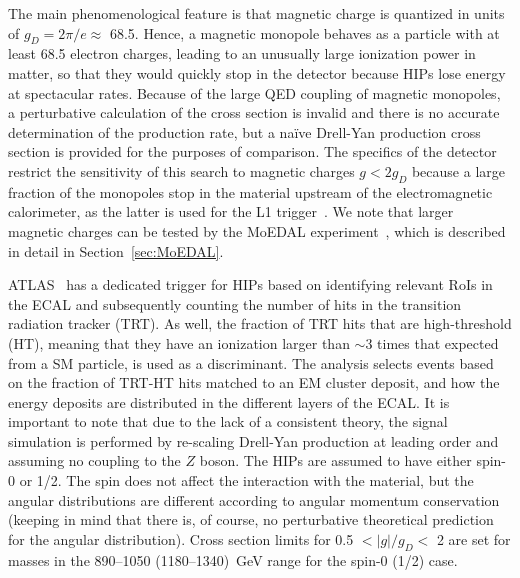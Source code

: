 The main phenomenological feature is that magnetic charge is quantized in units of $g_D = 2\pi/e \approx$ 68.5. Hence, a magnetic monopole behaves as a particle with at least 68.5 electron charges, leading to an unusually large ionization power in matter, so that they would quickly stop in the detector because HIPs lose energy at spectacular rates. Because of the large QED coupling of magnetic monopoles, a perturbative calculation of the cross section is invalid and there is no accurate determination of the production rate, but a na\"ive Drell-Yan production cross section is provided for the purposes of comparison. The specifics of the detector restrict the sensitivity of this search to magnetic charges $g < 2 g_D$ because a large fraction of the monopoles stop in the material upstream of the electromagnetic calorimeter, as the latter is used for the L1 trigger~\cite{DeRoeck:2011aa}. We note that larger magnetic charges can be tested by the MoEDAL experiment~\cite{MoEDAL:2016jlb}, which is described in detail in Section~\ref{sec:MoEDAL}.

ATLAS~\cite{Aad:2015kta} has a dedicated trigger for HIPs based on identifying relevant RoIs in the ECAL and subsequently counting the number of hits in the transition radiation tracker (TRT). As well, the fraction of TRT hits that are high-threshold (HT), meaning that they have an ionization larger than $\sim3$ times that expected from a SM particle, is used as a discriminant. The analysis selects events based on the fraction of TRT-HT hits matched to an EM cluster deposit, and how the energy deposits are distributed in the different layers of the ECAL. It is important to note that due to the lack of a consistent theory, the signal simulation is performed by re-scaling Drell-Yan production at leading order and assuming no coupling to the $Z$ boson. The HIPs are assumed to have either spin-0 or 1/2. The spin does not affect the interaction with the material, but the angular distributions are different according to angular momentum conservation (keeping in mind that there is, of course, no perturbative theoretical prediction for the angular distribution). Cross section limits for 0.5 $< |g|/g_D <$ 2 are set for masses in the 890--1050 (1180--1340)~GeV range for the spin-0 (1/2) case.

